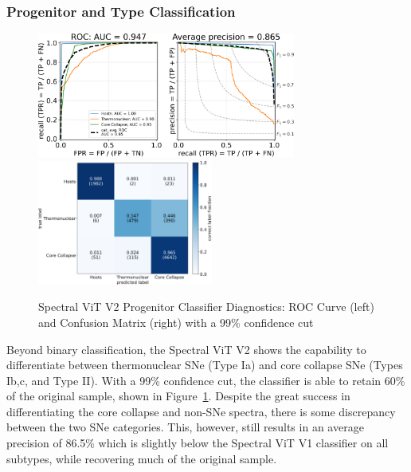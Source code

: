 \subsubsection{Progenitor and Type Classification}
\begin{figure}[htb!]
    \centering
    \includegraphics[height=4.1cm]{figures/v2_applications/vit_model_V2roc99_proj_e26.png}
    \quad
    \includegraphics[height=4.1cm]{figures/v2_applications/vit_model_V2cm99_proj_e26.png}
    \caption[Spectral ViT V2 Progenitor Classifier Diagnostics]{Spectral ViT V2 
    Progenitor Classifier Diagnostics: ROC Curve (left) and Confusion Matrix (right) with a 99\% confidence
    cut\label{fig:v2_99_proj_qual}}
\end{figure}
Beyond binary classification, the Spectral ViT V2 shows the capability to differentiate between 
thermonuclear SNe (Type Ia) and core collapse SNe (Types Ib,c, and Type II). With a 99\% confidence 
cut, the classifier is able to retain 60\% of the original sample, shown in Figure~\ref{fig:v2_99_proj_qual}. 
Despite the great success in differentiating the core collapse and non-SNe spectra, there is some discrepancy 
between the two SNe categories. This, however, still results in an average precision of 86.5\% which is slightly
below the Spectral ViT V1 classifier on all subtypes, while recovering much of the original sample. 
